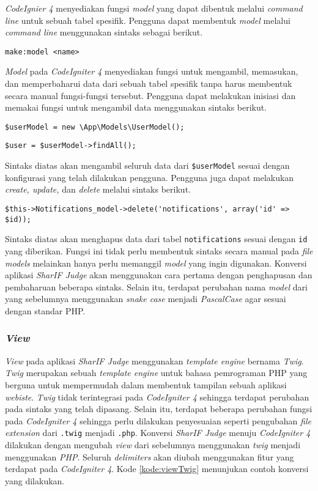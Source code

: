 \begin{enumerate}
\textit{CodeIgnier 4} menyediakan fungsi \textit{model} yang dapat dibentuk melalui \textit{command line} untuk sebuah tabel spesifik. Pengguna dapat membentuk \textit{model} melalui \textit{command line} menggunakan sintaks sebagai berikut.
\begin{center}
	\verb|make:model <name>|
\end{center}
\textit{Model} pada \textit{CodeIgniter 4} menyediakan fungsi untuk mengambil, memasukan, dan memperbaharui data dari sebuah tabel spesifik tanpa harus membentuk secara manual fungsi-fungsi tersebut. Pengguna dapat melakukan inisiasi dan memakai fungsi untuk mengambil data menggunakan sintaks berikut.
\begin{center}
	\verb|$userModel = new \App\Models\UserModel();|
\end{center}
\begin{center}
	\verb|$user = $userModel->findAll();|
\end{center}
\end{enumerate}

Sintaks diatas akan mengambil seluruh data dari \verb|$userModel| sesuai dengan konfigurasi yang telah dilakukan pengguna. Pengguna juga dapat melakukan \textit{create, update,} dan \textit{delete} melalui sintaks berikut.

\begin{center}
	\verb|$this->Notifications_model->delete('notifications', array('id' => $id));|
\end{center}
Sintaks diatas akan menghapus data dari tabel \texttt{notifications} sesuai dengan \texttt{id} yang diberikan. Fungsi ini tidak perlu membentuk sintaks secara manual pada \textit{file} \textit{models} melainkan hanya perlu memanggil \textit{model} yang ingin digunakan. Konversi aplikasi \textit{SharIF Judge} akan menggunakan cara pertama dengan penghapusan dan pembaharuan beberapa sintaks. Selain itu, terdapat perubahan nama \textit{model} dari yang sebelumnya menggunakan \textit{snake case} menjadi \textit{PascalCase} agar sesuai dengan standar PHP.

\subsubsection{\textit{View}}
\textit{View} pada aplikasi \textit{SharIF Judge} menggunakan \textit{template engine} bernama \textit{Twig}. \textit{Twig} merupakan sebuah \textit{template engine} untuk bahasa pemrograman PHP yang berguna untuk mempermudah dalam membentuk tampilan sebuah aplikasi \textit{webiste}. \textit{Twig} tidak terintegrasi pada \textit{CodeIgniter 4} sehingga terdapat perubahan pada sintaks yang telah dipasang. Selain itu, terdapat beberapa perubahan fungsi pada \textit{CodeIgniter 4} sehingga perlu dilakukan penyesuaian seperti pengubahan \textit{file extension} dari \texttt{.twig} menjadi \texttt{.php}. Konversi \textit{SharIF Judge} menuju \textit{CodeIgniter 4} dilakukan dengan mengubah \textit{view} dari sebelumnya menggunakan \textit{twig} menjadi menggunakan \textit{PHP}. Seluruh \textit{delimiters} akan diubah menggunakan fitur yang terdapat pada \textit{CodeIgniter 4}. Kode \ref{kode:viewTwig} menunjukan contoh konversi yang dilakukan.

